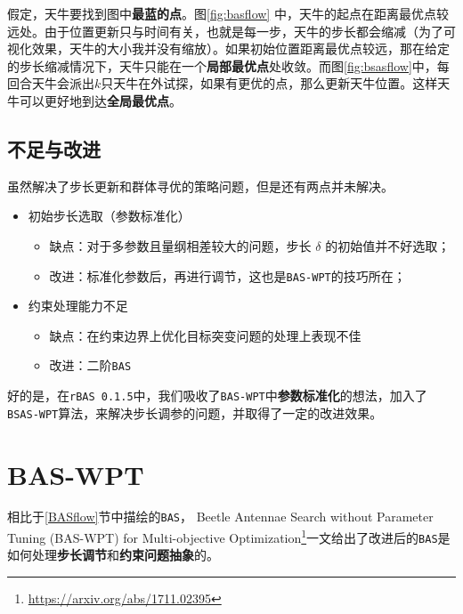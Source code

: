 \documentclass[]{ctexbook}
\providecommand{\tightlist}{%
  \setlength{\itemsep}{0pt}\setlength{\parskip}{0pt}}
\renewcommand{\href}[2]{#2\footnote{\url{#1}}}
\begin{document}
假定，天牛要找到图中\textbf{最蓝的点}。图\ref{fig:basflow}
中，天牛的起点在距离最优点较远处。由于位置更新只与时间有关，也就是每一步，天牛的步长都会缩减（为了可视化效果，天牛的大小我并没有缩放）。如果初始位置距离最优点较远，那在给定的步长缩减情况下，天牛只能在一个\textbf{局部最优点}处收敛。而图\ref{fig:bsasflow}中，每回合天牛会派出\(k\)只天牛在外试探，如果有更优的点，那么更新天牛位置。这样天牛可以更好地到达\textbf{全局最优点}。

\subsection{不足与改进}\label{BSASimprove}

虽然解决了步长更新和群体寻优的策略问题，但是还有两点并未解决。

\begin{itemize}
\tightlist
\item
  初始步长选取（参数标准化）

  \begin{itemize}
  \tightlist
  \item
    缺点：对于多参数且量纲相差较大的问题，步长 \(\delta\)
    的初始值并不好选取；
  \item
    改进：标准化参数后，再进行调节，这也是\texttt{BAS-WPT}的技巧所在；
  \end{itemize}
\item
  约束处理能力不足

  \begin{itemize}
  \tightlist
  \item
    缺点：在约束边界上优化目标突变问题的处理上表现不佳
  \item
    改进：二阶\texttt{BAS}
  \end{itemize}
\end{itemize}

好的是，在\texttt{rBAS\ 0.1.5}中，我们吸收了\texttt{BAS-WPT}中\textbf{参数标准化}的想法，加入了\texttt{BSAS-WPT}算法，来解决步长调参的问题，并取得了一定的改进效果。

\section{BAS-WPT}\label{bas-wpt}

相比于\ref{BASflow}节中描绘的\texttt{BAS}，
\href{https://arxiv.org/abs/1711.02395}{Beetle Antennae Search without
Parameter Tuning (BAS-WPT) for Multi-objective
Optimization}一文给出了改进后的\texttt{BAS}是如何处理\textbf{步长调节}和\textbf{约束问题抽象}的。
\end{document}
